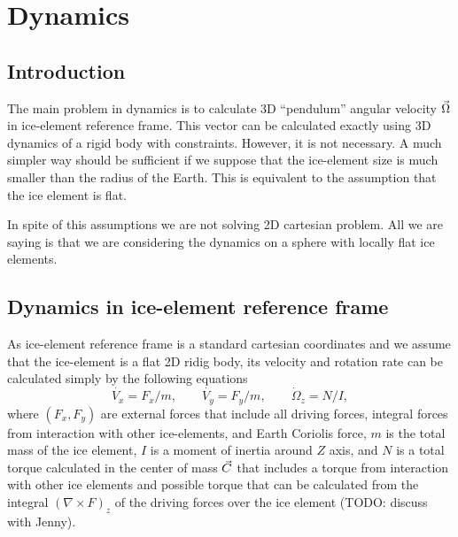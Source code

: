 
\chapter{Dynamics}


\section{Introduction}

The main problem in dynamics is to calculate 3D ``pendulum'' angular
velocity ${\vec{\Omega}}$ in ice-element reference frame. This vector
can be calculated exactly using 3D dynamics of a rigid body with
constraints. However, it is not necessary. A much simpler way should
be sufficient if we suppose that the ice-element size is much smaller
than the radius of the Earth. This is equivalent to the assumption
that the ice element is flat.

In spite of this assumptions we are not solving 2D cartesian
problem. All we are saying is that we are considering the dynamics on
a sphere with locally flat ice elements.


\section{Dynamics in ice-element reference frame}

As ice-element reference frame is a standard cartesian coordinates and
we assume that the ice-element is a flat 2D ridig body, its velocity
and rotation rate can be calculated simply by the following equations
\begin{equation}\label{eq:dynamicsset}
  \dot{V_x} = F_x/m, \qquad \dot{V_y} = F_y/m, 
  \qquad \dot\Omega_z = N/I,
\end{equation}
where $(F_x,F_y)$ are external forces that include all driving forces,
integral forces from interaction with other ice-elements, and Earth
Coriolis force, $m$ is the total mass of the ice element, $I$ is a
moment of inertia around $Z$ axis, and $N$ is a total torque
calculated in the center of mass ${\vec{C}}$ that includes a torque from
interaction with other ice elements and possible torque that can be
calculated from the integral $(\nabla\times F)_z$ of the driving
forces over the ice element (TODO: discuss with Jenny).

